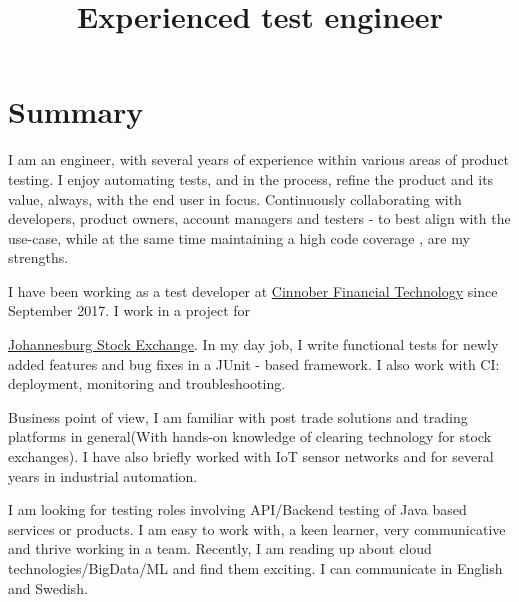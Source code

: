\documentclass[12pt,a4paper,sans]{moderncv} %
\title{Experienced test engineer}
\begin{document}
\makecvtitle


\section{Summary}
I am an engineer, with several years of experience within various areas of product testing. I enjoy automating tests, and in the process,
refine the product and its value, always, with the end user in focus. Continuously collaborating with developers, product owners,
account managers and testers - to best align with the use-case, while at the same time maintaining a high code coverage , are my strengths.

\hfill \break
I have been working as a test developer at {\href{https://www.cinnober.com/}{\color{cyan}Cinnober Financial Technology}} since September 2017. I work
in a project for {\href{https://www.jse.co.za/}{{\color{cyan}Johannesburg Stock Exchange}}. In my day job, I write functional tests for newly added features and bug fixes in a JUnit - based framework. I also work with CI:
deployment, monitoring and troubleshooting.


\hfill \break
Business point of view, I am familiar with post trade solutions and
trading platforms in general(With hands-on knowledge of clearing technology for stock exchanges). I have also briefly worked
with IoT sensor networks and for several years in industrial automation.

\hfill \break
I am looking for testing roles involving API/Backend testing of Java based services or products. I am easy to work with,
a keen learner, very communicative and thrive working in a team. Recently, I am reading up about cloud technologies/BigData/ML
and find them exciting. I can communicate in English and Swedish.


}
\end{document}
